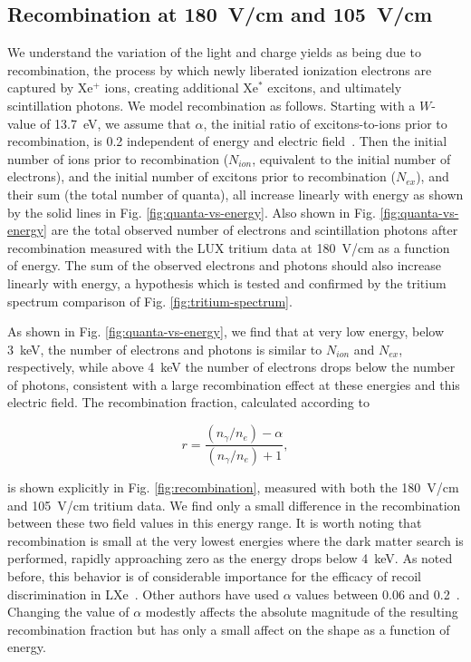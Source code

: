 \subsection{Recombination at 180~V/cm and 105~V/cm}

We understand the variation of the light and charge yields as being due to recombination, the process by which newly liberated ionization electrons are captured by Xe$^+$ ions, creating additional Xe$^*$ excitons, and ultimately scintillation photons. We model recombination as follows. Starting with a $W$-value of 13.7~eV, we assume that $\alpha$, the initial ratio of excitons-to-ions prior to recombination, is 0.2 independent of energy and electric field~\cite{Doke_alpha}. Then the initial number of ions prior to recombination ($N_{ion}$, equivalent to the initial number of electrons), and the initial number of excitons prior to recombination ($N_{ex}$), and their sum (the total number of quanta), all increase linearly with energy as shown by the solid lines in Fig. \ref{fig:quanta-vs-energy}. Also shown in Fig. \ref{fig:quanta-vs-energy} are the total observed number of electrons and scintillation photons after recombination measured with the LUX tritium data at 180~V/cm as a function of energy. The sum of the observed electrons and photons should also increase linearly with energy, a hypothesis which is tested and confirmed by the tritium spectrum comparison of Fig. \ref{fig:tritium-spectrum}.

As shown in Fig. \ref{fig:quanta-vs-energy}, we find that at very low energy, below 3~keV, the number of electrons and photons is similar to $N_{ion}$ and $N_{ex}$, respectively, while above 4~keV the number of electrons drops below the number of photons, consistent with a large recombination effect at these energies and this electric field. The recombination fraction, calculated according to

\begin{equation}
r = \frac{(n_{\gamma}/n_e) - \alpha}{(n_{\gamma}/n_e) + 1},
\end{equation}

\noindent
is shown explicitly in Fig. \ref{fig:recombination}, measured with both the 180~V/cm and 105~V/cm tritium data. We find only a small difference in the recombination between these two field values in this energy range. It is worth noting that recombination is small at the very lowest energies where the dark matter search is performed, rapidly approaching zero as the energy drops below 4~keV. As noted before, this behavior is of considerable importance for the efficacy of recoil discrimination in LXe~\cite{xed-discrimination}. Other authors have used $\alpha$ values between 0.06 and 0.2~\cite{kaixuan}. Changing the value of $\alpha$ modestly affects the absolute magnitude of the resulting recombination fraction but has only a small affect on the shape as a function of energy. 

